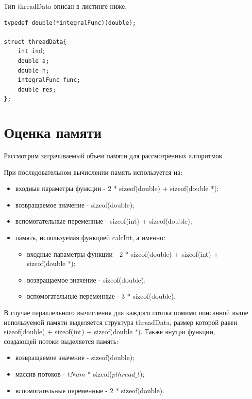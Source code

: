 Тип threadData описан в листинге ниже.

\captionsetup{singlelinecheck = false, justification=raggedright}
\begin{lstlisting}[label=threadData, caption=Тип данных потока]
typedef double(*integralFunc)(double);

struct threadData{
    int ind;
    double a;
    double h;
    integralFunc func;
    double res;
};
\end{lstlisting}
\captionsetup{singlelinecheck = false, justification=centering}

\section{Оценка памяти}

Рассмотрим затрачиваемый объем памяти для рассмотренных алгоритмов. 

При последовательном вычислении память используется на:
\begin{itemize}
	\item входные параметры функции - 2 * sizeof(double) + sizeof(double *);
	\item возвращаемое значение - sizeof(double);
	\item вспомогательные переменные - sizeof(int) + sizeof(double);
	\item память, используемая функцией calcInt, а именно:
	\begin{itemize}
		\item входные параметры функции - 2 * sizeof(double) + sizeof(int) + sizeof(double *);
		\item возвращаемое значение - sizeof(double);
		\item вспомогательные переменные - 3 * sizeof(double).
	\end{itemize}
\end{itemize}

В случае параллельного вычисления для каждого потока помимо описанной выше используемой памяти выделяется структура threadData, размер которой равен sizeof(double) + sizeof(int) + sizeof(double *).
Также внутри функции, создающей потоки выделяется память:
\begin{itemize}
	\item возвращаемое значение - sizeof(double);
	\item массив потоков - $tNum$ * sizeof($pthread\_t$);
	\item вспомогательные переменные - 2 * sizeof(double).
\end{itemize}

